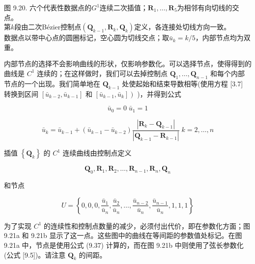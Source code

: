 \documentclass[../main.tex]{subfiles}
\begin{document}
\begin{center}
\begin{minipage}{29cm}
\vspace*{.6\baselineskip}
\centering
{}
\par\smallskip
图 9.20. 六个代表性数据点的$G^1$连续二次插值；$\mathbf R_1,\ldots,\mathbf R_5$为相邻有向切线的交点。\\
第$k$段由二次Bézier控制点$(\mathbf Q_{k-1},\mathbf R_k,\mathbf Q_k)$定义，各连接处切线方向一致。\\
数据点以带中心点的圆圈标记，空心圆为切线交点；取$\bar u_k=k/5$，内部节点均为双重。
\end{minipage}
\end{center}

内部节点的选择不会影响曲线的形状，仅影响参数化。可以选择节点，使得得到的曲线是 \({C}^{1}\) 连续的；在这样做时，我们可以去掉控制点 \({\mathbf{Q}}_{1},\ldots ,{\mathbf{Q}}_{n - 1}\) 和每个内部节点的一个出现。我们简单地在 \({\mathbf{Q}}_{k - 1}\) 处使起始和结束导数相等(使用方程 [3.7] 转换到区间 \(\left\lbrack  {{\bar{u}}_{k - 2},{\bar{u}}_{k - 1}}\right\rbrack\) 和 \(\left. \left\lbrack  {{\bar{u}}_{k - 1},{\bar{u}}_{k}}\right\rbrack  \right)\) )，并得到公式

\[
{\bar{u}}_{0} = 0\;{\bar{u}}_{1} = 1
\]

\[
{\bar{u}}_{k} = {\bar{u}}_{k - 1} + \left( {{\bar{u}}_{k - 1} - {\bar{u}}_{k - 2}}\right) \frac{\left| {\mathbf{R}}_{k} - {\mathbf{Q}}_{k - 1}\right| }{\left| {\mathbf{Q}}_{k - 1} - {\mathbf{R}}_{k - 1}\right| }\;k = 2,\ldots ,n \tag{9.37}
\]

插值 \(\left\{  {\mathbf{Q}}_{k}\right\}\) 的 \({C}^{1}\) 连续曲线由控制点定义

\[
{\mathbf{Q}}_{0},{\mathbf{R}}_{1},{\mathbf{R}}_{2},\ldots ,{\mathbf{R}}_{n - 1},{\mathbf{R}}_{n},{\mathbf{Q}}_{n} \tag{9.38}
\]



和节点

\[
U = \left\{  {0,0,0,\frac{{\bar{u}}_{1}}{{\bar{u}}_{n}},\frac{{\bar{u}}_{2}}{{\bar{u}}_{n}},\ldots ,\frac{{\bar{u}}_{n - 2}}{{\bar{u}}_{n}},\frac{{\bar{u}}_{n - 1}}{{\bar{u}}_{n}},1,1,1}\right\}   \tag{9.39}
\]

为了实现 \({C}^{1}\) 的连续性和控制点数量的减少，必须付出代价，即在参数化方面；图 9.21a 和 9.21b 显示了这一点。这些图中的曲线在等间距的参数值处标记。在图 9.21a 中，节点是使用公式 (9.37) 计算的，而在图 9.21b 中则使用了弦长参数化 (公式 [9.5])。请注意 \({\mathbf{Q}}_{k}\) 的间距。
\end{document}
